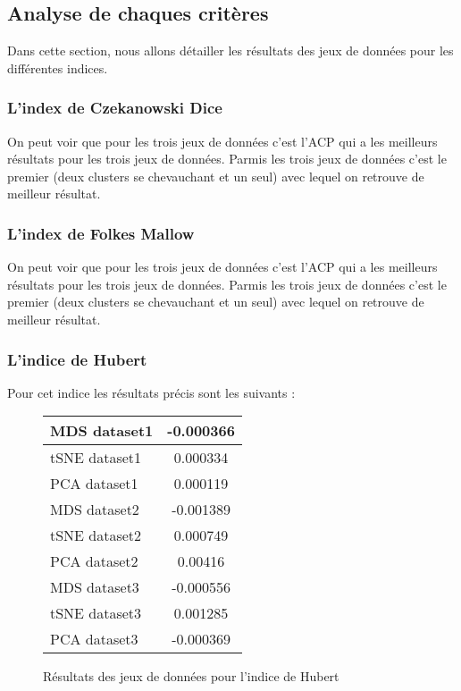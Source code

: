 \subsection{Analyse de chaques critères}
Dans cette section, nous allons détailler les résultats des jeux de données pour les différentes indices.

\subsubsection{L'index de Czekanowski Dice}
On peut voir que pour les trois jeux de données c'est l'ACP qui a les meilleurs résultats pour les trois jeux de données.
Parmis les trois jeux de données c'est le premier (deux clusters se chevauchant et un seul) avec lequel on retrouve de meilleur résultat.

\subsubsection{L'index de Folkes Mallow}
On peut voir que pour les trois jeux de données c'est l'ACP qui a les meilleurs résultats pour les trois jeux de données.
Parmis les trois jeux de données c'est le premier (deux clusters se chevauchant et un seul) avec lequel on retrouve de meilleur résultat.

\subsubsection{L'indice de Hubert}
Pour cet indice les résultats précis sont les suivants : 
\smallskip

\begin{center}
    \begin{figure}[!ht]  
        \begin{tabular}{ | l | c | }
            \hline			
            MDS dataset1 & -0.000366 \\ \hline
            tSNE dataset1 & 0.000334 \\ \hline
            PCA dataset1 & 0.000119  \\ \hline
            MDS dataset2 & -0.001389 \\  \hline
            tSNE dataset2 & 0.000749 \\ \hline
            PCA dataset2 & 0.00416  \\ \hline
            MDS dataset3 & -0.000556 \\ \hline
            tSNE dataset3 & 0.001285 \\ \hline
            PCA dataset3 & -0.000369  \\ 
            \hline  
        \end{tabular}
    \caption{Résultats des jeux de données pour l'indice de Hubert}
    \end{figure}
\end{center}
\smallskip

